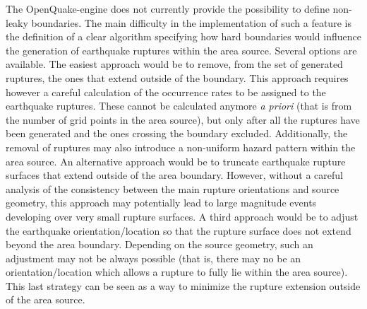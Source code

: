 The OpenQuake-engine does not currently provide the possibility to define non-leaky boundaries. The main difficulty in the implementation of such a feature is the definition of a clear algorithm specifying how hard boundaries would influence the generation of earthquake ruptures within the area source. Several options are available. The easiest approach would be to remove, from the set of generated ruptures, the ones that extend outside of the boundary. This approach requires however a careful calculation of the occurrence rates to be assigned to the earthquake ruptures. These cannot be calculated anymore \textit{a priori} (that is from the number of grid points in the area source), but only after all the ruptures have been generated and the ones crossing the boundary excluded. Additionally, the removal of ruptures may also introduce a non-uniform hazard pattern within the area source. An alternative approach would be to truncate earthquake rupture surfaces that extend outside of the area boundary. However, without a careful analysis of the consistency between the main rupture orientations and source geometry, this approach may potentially lead to large magnitude events developing over very small rupture surfaces. A third approach would be to adjust the earthquake orientation/location so that the rupture surface does not extend beyond the area boundary. Depending on the source geometry, such an adjustment may not be always possible (that is, there may no be an orientation/location which allows a rupture to fully lie within the area source). This last strategy can be seen as a way to minimize the rupture extension outside of the area source.

